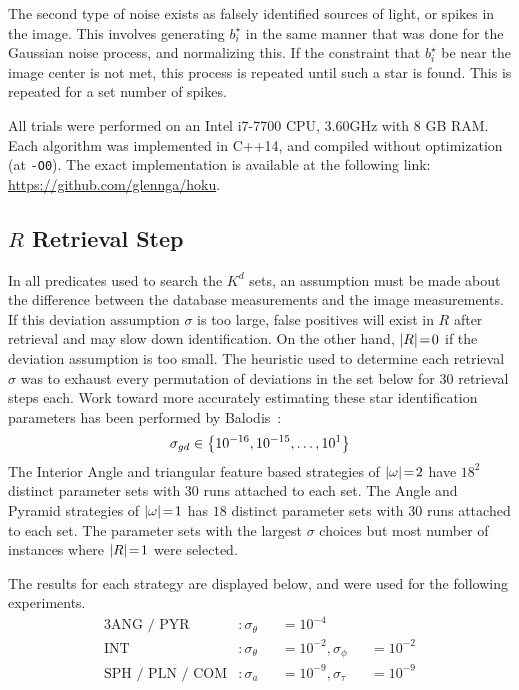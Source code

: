 The second type of noise exists as falsely identified sources of light, or spikes in the image.
This involves generating $b^\star_i$ in the same manner that was done for the Gaussian noise process, and normalizing
this.
If the constraint that $b^\star_i$ be near the image center is not met, this process is repeated until such a star is
found.
This is repeated for a set number of spikes.

All trials were performed on an Intel i7-7700 CPU, 3.60GHz with 8 GB RAM\@.
Each algorithm was implemented in C++14, and compiled without optimization (at \texttt{-O0}).
The exact implementation is available at the following link:
\url{https://github.com/glennga/hoku}.

\subsection{$R$ Retrieval Step}\label{subsec:catalogQueryStep}
In all predicates used to search the $K^d$ sets, an assumption must be made about the difference between the database
measurements and the image measurements.
If this deviation assumption $\sigma$ is too large, false positives will exist in $R$ after retrieval and may slow
down identification.
On the other hand, $\left| R \right| \!=\! 0$ if the deviation assumption is too small.
The heuristic used to determine each retrieval $\sigma$ was to exhaust every permutation of deviations in the set below for
30 retrieval steps each.
Work toward more accurately estimating these star identification parameters has been performed by
Balodis~\cite{balodis:parametersAutomated}:
\begin{equation}
    \sigma_{gd} \in \left\{  10^{-16}, 10^{-15}, \ldots, 10^1  \right\}
\end{equation}
The Interior Angle and triangular feature based strategies of $\left| \omega \right| \!=\! 2$ have $18^2$ distinct parameter sets
with 30 runs attached to each set.
The Angle and Pyramid strategies of $\left| \omega \right| \!=\! 1$ has $18$ distinct parameter sets with 30 runs attached to each set.
The parameter sets with the largest $\sigma$ choices but most number of instances where $\left| R \right| \!=\! 1$ were selected.

The results for each strategy are displayed below, and were used for the following experiments.
\begin{alignat*}{3}
    \text{ANG / PYR}&: \sigma_\theta &&= 10^{-4} &&{}\\
    \text{INT}&: \sigma_\theta &&= 10^{-2}, \sigma_\phi &&= 10^{-2} \\
    \text{SPH / PLN / COM}&: \sigma_a &&= 10^{-9}, \sigma_\tau &&= 10^{-9}
\end{alignat*}

